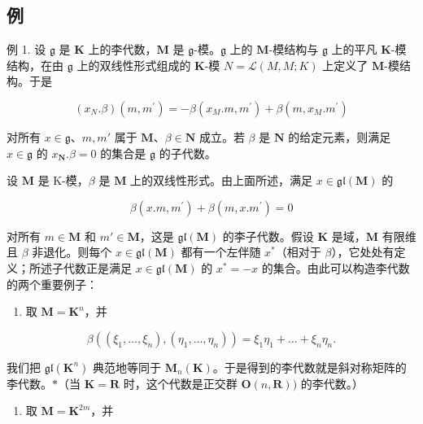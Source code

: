 \subsection{例}

例 1. 设 \(\mathfrak{g}\) 是 \(\mathbf{K}\) 上的李代数，\(\mathbf{M}\) 是 \(\mathfrak{g}\)-模。\(\mathfrak{g}\) 上的 \(\mathbf{M}\)-模结构与 \(\mathfrak{g}\) 上的平凡 \(\mathbf{K}\)-模结构，在由 \(\mathfrak{g}\) 上的双线性形式组成的 \(\mathbf{K}\)-模 \(N = \mathcal{L}(M, M; K)\) 上定义了 \(\mathbf{M}\)-模结构。于是

\[
(x _ {N}. \beta) (m, m ^ {\prime}) = - \beta (x _ {M}. m, m ^ {\prime}) + \beta (m, x _ {M}. m ^ {\prime})\tag{10}
\]

对所有 \(x \in \mathfrak{g}\)、\(m, m'\) 属于 \(\mathbf{M}\)、\(\beta \in \mathbf{N}\) 成立。若 \(\beta\) 是 \(\mathbf{N}\) 的给定元素，则满足 \(x \in \mathfrak{g}\) 的 \(x_{\mathbf{N}}. \beta = 0\) 的集合是 \(\mathfrak{g}\) 的子代数。

设 \(\mathbf{M}\) 是 K-模，\(\beta\) 是 \(\mathbf{M}\) 上的双线性形式。由上面所述，满足 \(x \in \mathfrak{gl}(\mathbf{M})\) 的

\[
\beta (x. m, m ^ {\prime}) + \beta (m, x. m ^ {\prime}) = 0
\]

对所有 \(m \in \mathbf{M}\) 和 \(m' \in \mathbf{M}\)，这是 \(\mathfrak{gl}(\mathbf{M})\) 的李子代数。假设 \(\mathbf{K}\) 是域，\(\mathbf{M}\) 有限维且 \(\beta\) 非退化。则每个 \(x \in \mathfrak{gl}(\mathbf{M})\) 都有一个左伴随 \(x^*\)（相对于 \(\beta\)），它处处有定义；所述子代数正是满足 \(x \in \mathfrak{gl}(\mathbf{M})\) 的 \(x^* = -x\) 的集合。由此可以构造李代数的两个重要例子：

\begin{enumerate}
\def\labelenumi{(\alph{enumi})}
\tightlist
\item
  取 \(\mathbf{M} = \mathbf{K}^n\)，并
\end{enumerate}

\[
\beta ((\xi_ {1}, \dots , \xi_ {n}), (\eta_ {1}, \dots , \eta_ {n})) = \xi_ {1} \eta_ {1} + \dots + \xi_ {n} \eta_ {n}.
\]

我们把 \(\mathfrak{gl}(\mathbf{K}^n)\) 典范地等同于 \(\mathbf{M}_n(\mathbf{K})\)。于是得到的李代数就是斜对称矩阵的李代数。\(*\)（当 \(\mathbf{K} = \mathbf{R}\) 时，这个代数是正交群 \(\mathbf{O}(n, \mathbf{R}))\) 的李代数。）

\begin{enumerate}
\def\labelenumi{(\alph{enumi})}
\setcounter{enumi}{1}
\tightlist
\item
  取 \(\mathbf{M} = \mathbf{K}^{2m}\)，并
\end{enumerate}

